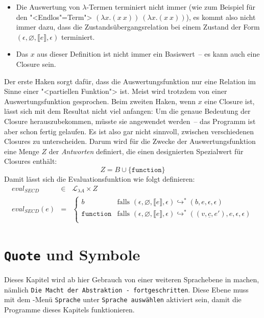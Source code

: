 %
\begin{itemize}
\item Die Auswertung von $\lambda$-Termen terminiert nicht immer (wie
  zum Beispiel für den "<Endlos"=Term"> $(\lambda x.(x~x))~(\lambda x.(x~x))$), es kommt
  also nicht immer dazu, dass die Zustandsübergangsrelation bei einem
  Zustand der Form $(\epsilon, \varnothing, \llbracket e\rrbracket,
  \epsilon)$ terminiert.
\item Das $x$ aus dieser Definition ist nicht immer ein Basiswert~--
  es kann auch eine Closure sein.
\end{itemize}
%
Der erste Haken sorgt dafür, dass die Auswertungsfunktion nur eine
Relation im Sinne einer "<partiellen Funktion"> ist.  Meist wird
trotzdem von einer Auswertungsfunktion gesprochen.  Beim zweiten
Haken, wenn $x$ eine Closure ist, lässt sich mit dem Resultat nicht
viel anfangen: Um die genaue Bedeutung der Closure herauszubekommen,
müsste sie angewendet werden~-- das Programm ist aber schon fertig
gelaufen.  Es ist also gar nicht sinnvoll, zwischen verschiedenen
Closures zu unterscheiden.  Darum wird für die Zwecke der
Auswertungsfunktion eine Menge $Z$ der \textit{Antworten}
definiert, die einen designierten Spezialwert für Closures enthält:
%
\begin{displaymath}
  Z = B \cup \{ \texttt{function} \}
\end{displaymath}
%
Damit lässt sich die Evaluationsfunktion wie folgt definieren:
%
\begin{eqnarray*}
  \mathit{eval}_\mathit{SECD} & \in & \mathcal{L}_{\lambda{}A} \times Z\\
  \mathit{eval}_\mathit{SECD}(e) & = &
  \begin{cases}
    b & \textrm{falls } (\epsilon, \varnothing, \llbracket e\rrbracket, \epsilon)
    \hookrightarrow^* (b, e, \epsilon, \epsilon)\\
    \texttt{function} & \textrm{falls } (\epsilon, \varnothing, \llbracket e\rrbracket, \epsilon)
    \hookrightarrow^* ((v, \underline{c}, e'), e, \epsilon, \epsilon)\\
  \end{cases}
\end{eqnarray*}

\section{\texttt{Quote} und Symbole}
\label{sec:quote}

Dieses Kapitel wird ab hier Gebrauch von einer weiteren
Sprachebene in
\drscheme{} machen, nämlich \texttt{Die Macht der Abstraktion -
  fortgeschritten}.  Diese Ebene muss mit dem \drscheme{}-Menü \texttt{Sprache}
unter \texttt{Sprache auswählen} aktiviert sein, damit die
Programme dieses Kapitels funktionieren.

